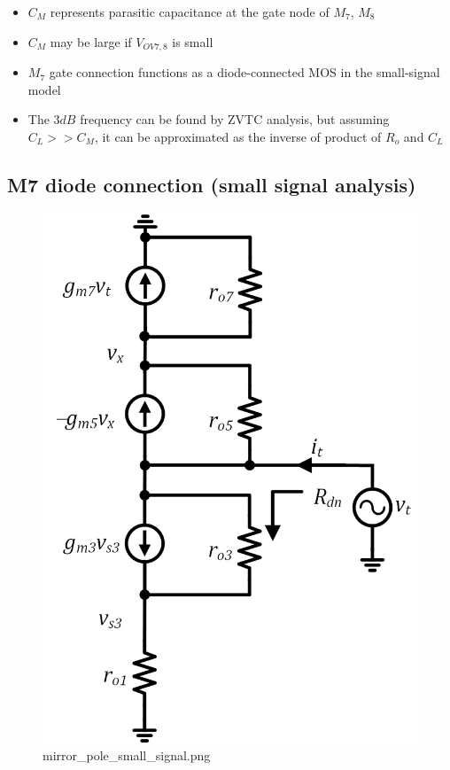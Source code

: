 \documentclass[11pt]{article}
\begin{document}
    \begin{itemize}
\item
  \(C_M\) represents parasitic capacitance at the gate node of \(M_7\),
  \(M_8\)
\item
  \(C_M\) may be large if \(V_{OV7,8}\) is small
\item
  \(M_7\) gate connection functions as a diode-connected MOS in the
  small-signal model
\item
  The \(3dB\) frequency can be found by ZVTC analysis, but assuming
  \(C_L >> C_M\), it can be approximated as the inverse of product of
  \(R_o\) and \(C_L\)
\end{itemize}

    \hypertarget{m7-diode-connection-small-signal-analysis}{%
\subsection{M7 diode connection (small signal
analysis)}\label{m7-diode-connection-small-signal-analysis}}

    \begin{figure}
\centering
\includegraphics{mirror_pole_small_signal.png}
\caption{mirror\_pole\_small\_signal.png}
\end{figure}
\end{document}
